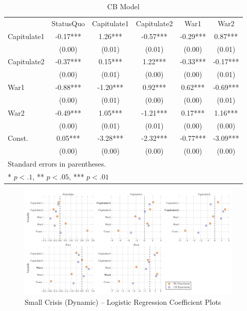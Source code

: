 \begin{table}[h!]
	\begin{subtable}{\textwidth}
		\begin{center}
			\caption{CB Model}
		\begin{tabular}{lccccc}
					&			&			  &				&		   &           \\
		\hline
		            & StatusQuo & Capitulate1 & Capitulate2 &   War1   &   War2     \\
		\hline
		Capitulate1 & -0.17***  & 1.26***     & -0.57***    & -0.29*** & 0.87***   \\
		            & (0.00)    & (0.01)      & (0.01)      & (0.00)   & (0.01)    \\
		Capitulate2 & -0.37***  & 0.15***     & 1.22***     & -0.33*** & -0.17***  \\
		            & (0.00)    & (0.01)      & (0.00)      & (0.00)   & (0.01)    \\
		War1        & -0.88***  & -1.20***    & 0.92***     & 0.62***  & -0.69***  \\
		            & (0.00)    & (0.01)      & (0.00)      & (0.00)   & (0.01)    \\
		War2        & -0.49***  & 1.05***     & -1.21***    & 0.17***  & 1.16***   \\
		            & (0.00)    & (0.01)      & (0.01)      & (0.00)   & (0.00)    \\
		Const.      & 0.05***   & -3.28***    & -2.32***    & -0.77*** & -3.09***  \\
		            & (0.00)    & (0.00)      & (0.00)      & (0.00)   & (0.00)    \\
		\hline
		\hline
		\multicolumn{6}{l}{Standard errors in parentheses.} \\
		\multicolumn{6}{l}{* $p<.1$, ** $p<.05$, *** $p<.01$} \\
		\end{tabular}
		\end{center}
	\end{subtable}
	\tableSpace
\end{table}

\begin{figure}[h!]
	\includegraphics[width=0.95\textwidth]{WarReason/Figures/SC2_Coeffs}
    \caption{Small Crisis (Dynamic) -- Logistic Regression Coefficient Plots}
    \label{fig:sc2_coeffs}
    \figSpace
\end{figure}

